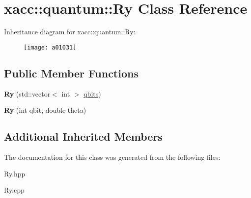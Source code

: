 \hypertarget{a01031}{}\section{xacc\+:\+:quantum\+:\+:Ry Class Reference}
\label{a01031}
Inheritance diagram for xacc\+:\+:quantum\+:\+:Ry\+:\begin{figure}[H]
\begin{center}
\leavevmode
\texttt{[image: a01031]}
\end{center}
\end{figure}
\subsection*{Public Member Functions}
\begin{DoxyCompactItemize}
\item 
\mbox{\label{a01031_a542e1c0576a8e784f6cece4c77598486}} 
{\bfseries Ry} (std\+::vector$<$ int $>$ \hyperlink{a00991_a2a56be6c2519ea65df4d06f4abae1393}{qbits})
\item 
\mbox{\label{a01031_a1cb81fe622168ba8d79fa2a78b5b0006}} 
{\bfseries Ry} (int qbit, double theta)
\end{DoxyCompactItemize}
\subsection*{Additional Inherited Members}


The documentation for this class was generated from the following files\+:\begin{DoxyCompactItemize}
\item 
Ry.\+hpp\item 
Ry.\+cpp\end{DoxyCompactItemize}
